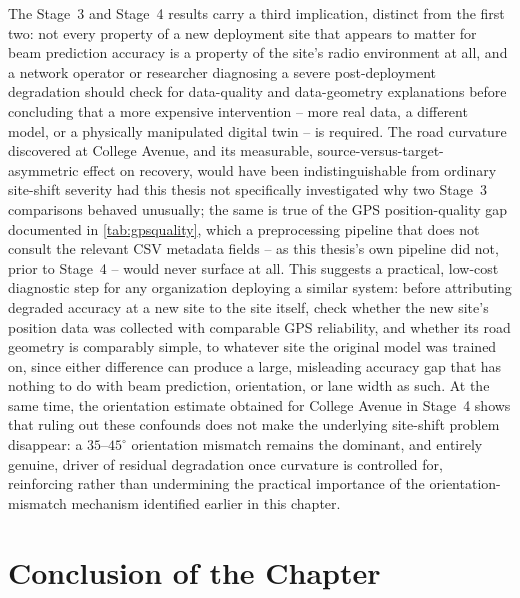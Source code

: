 \documentclass{iutbscthesis}
\begin{document}
The Stage~3 and Stage~4 results carry a third implication, distinct from the first two: not every property of a new deployment site that appears to matter for beam prediction accuracy is a property of the site's radio environment at all, and a network operator or researcher diagnosing a severe post-deployment degradation should check for data-quality and data-geometry explanations before concluding that a more expensive intervention -- more real data, a different model, or a physically manipulated digital twin -- is required. The road curvature discovered at College Avenue, and its measurable, source-versus-target-asymmetric effect on recovery, would have been indistinguishable from ordinary site-shift severity had this thesis not specifically investigated why two Stage~3 comparisons behaved unusually; the same is true of the GPS position-quality gap documented in \autoref{tab:gpsquality}, which a preprocessing pipeline that does not consult the relevant CSV metadata fields -- as this thesis's own pipeline did not, prior to Stage~4 -- would never surface at all. This suggests a practical, low-cost diagnostic step for any organization deploying a similar system: before attributing degraded accuracy at a new site to the site itself, check whether the new site's position data was collected with comparable GPS reliability, and whether its road geometry is comparably simple, to whatever site the original model was trained on, since either difference can produce a large, misleading accuracy gap that has nothing to do with beam prediction, orientation, or lane width as such. At the same time, the orientation estimate obtained for College Avenue in Stage~4 shows that ruling out these confounds does not make the underlying site-shift problem disappear: a $35$--$45^\circ$ orientation mismatch remains the dominant, and entirely genuine, driver of residual degradation once curvature is controlled for, reinforcing rather than undermining the practical importance of the orientation-mismatch mechanism identified earlier in this chapter.

\section{Conclusion of the Chapter}
\label{sec:chresultssummary}
\end{document}
